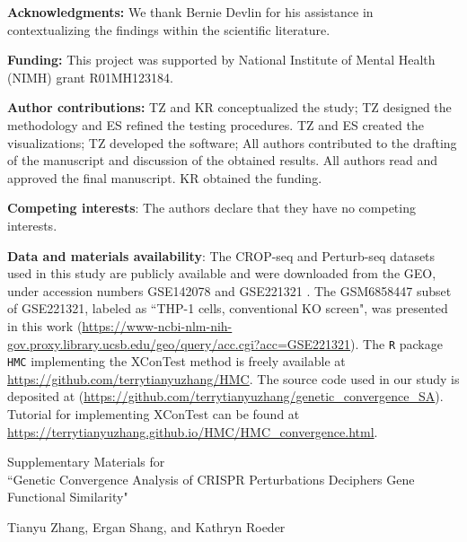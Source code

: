 \documentclass[11pt]{article}
\begin{document}

%


\vspace{2cm}
\textbf{Acknowledgments:} We thank %
Bernie Devlin for his assistance in contextualizing the findings within the scientific literature.

\textbf{Funding:} This project was supported by National Institute of Mental Health (NIMH) grant R01MH123184.

\textbf{Author contributions:}
	TZ and KR conceptualized the study; TZ designed the methodology and ES refined the testing procedures.
	TZ and ES created the visualizations; TZ developed the software; All authors contributed to the drafting of the manuscript and discussion of the obtained results. All authors read and approved the final manuscript. 
    KR obtained the funding.
    
\textbf{Competing interests}: The authors declare that they have no competing interests.

\textbf{Data and materials availability}: The CROP-seq and Perturb-seq datasets used in this study are publicly available and were downloaded from the GEO, under accession numbers  GSE142078 \citep{lalli2020high} and GSE221321 \citep{yao2024scalable}. The GSM6858447 subset of GSE221321, labeled as ``THP-1 cells, conventional KO screen", was presented in this work (\url{https://www-ncbi-nlm-nih-gov.proxy.library.ucsb.edu/geo/query/acc.cgi?acc=GSE221321}). The \texttt{R} package \texttt{HMC} implementing the XConTest method is freely available at \url{https://github.com/terrytianyuzhang/HMC}. The source code used in our study is deposited at (\url{https://github.com/terrytianyuzhang/genetic_convergence_SA}). Tutorial for implementing XConTest can be found at \url{https://terrytianyuzhang.github.io/HMC/HMC_convergence.html}.


\newpage

\begin{center}
    {\LARGE Supplementary Materials for \\
    ``Genetic Convergence Analysis of CRISPR Perturbations Deciphers Gene Functional Similarity"}
\end{center}
\appendix
{}
\setcounter{figure}{0}
\renewcommand{\thefigure}{S\arabic{figure}}
\setcounter{table}{0}
\renewcommand{\thetable}{S\arabic{table}}

\begin{center}
    Tianyu Zhang, Ergan Shang, and Kathryn Roeder
\end{center}
\vspace{3cm}
\end{document}

